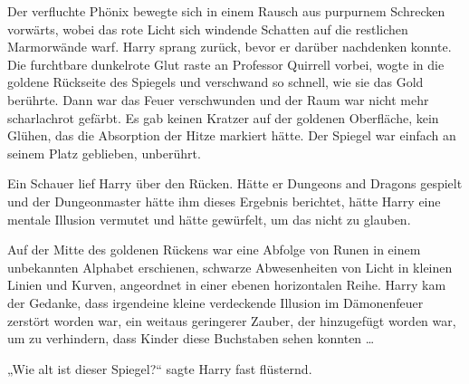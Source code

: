 Der verfluchte Phönix bewegte sich in einem Rausch aus purpurnem Schrecken vorwärts, wobei das rote Licht sich windende Schatten auf die restlichen Marmorwände warf. Harry sprang zurück, bevor er darüber nachdenken konnte.
Die furchtbare dunkelrote Glut raste an Professor Quirrell vorbei, wogte in die goldene Rückseite des Spiegels und verschwand so schnell, wie sie das Gold berührte.
Dann war das Feuer verschwunden und der Raum war nicht mehr scharlachrot gefärbt.
Es gab keinen Kratzer auf der goldenen Oberfläche, kein Glühen, das die Absorption der Hitze markiert hätte. Der Spiegel war einfach an seinem Platz geblieben, unberührt.

Ein Schauer lief Harry über den Rücken. Hätte er Dungeons and Dragons gespielt und der Dungeonmaster hätte ihm dieses Ergebnis berichtet, hätte Harry eine mentale Illusion vermutet und hätte gewürfelt, um das nicht zu glauben.

Auf der Mitte des goldenen Rückens war eine Abfolge von Runen in einem unbekannten Alphabet erschienen, schwarze Abwesenheiten von Licht in kleinen Linien und Kurven, angeordnet in einer ebenen horizontalen Reihe. Harry kam der Gedanke, dass irgendeine kleine verdeckende Illusion im Dämonenfeuer zerstört worden war, ein weitaus geringerer Zauber, der hinzugefügt worden war, um zu verhindern, dass Kinder diese Buchstaben sehen konnten …

„Wie alt ist dieser Spiegel?“ sagte Harry fast flüsternd.

